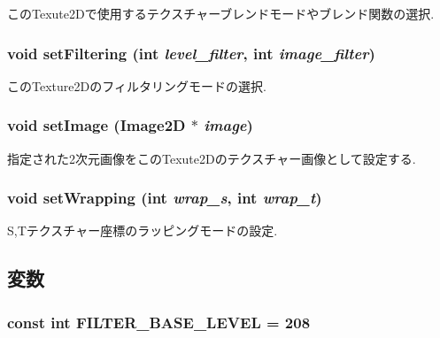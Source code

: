 このTexute2Dで使用するテクスチャーブレンドモードやブレンド関数の選択. \hypertarget{classm3g_1_1Texture2D_857574b5c0f3e0ca9239bafb4008cae1}{
\subsubsection[{setFiltering}]{\setlength{\rightskip}{0pt plus 5cm}void setFiltering (int {\em level\_\-filter}, \/  int {\em image\_\-filter})}}
\label{classm3g_1_1Texture2D_857574b5c0f3e0ca9239bafb4008cae1}


このTexture2Dのフィルタリングモードの選択. \hypertarget{classm3g_1_1Texture2D_705b89b41cd1b38f664ed912be44baaa}{
\subsubsection[{setImage}]{\setlength{\rightskip}{0pt plus 5cm}void setImage ({\bf Image2D} $\ast$ {\em image})}}
\label{classm3g_1_1Texture2D_705b89b41cd1b38f664ed912be44baaa}


指定された2次元画像をこのTexute2Dのテクスチャー画像として設定する. \hypertarget{classm3g_1_1Texture2D_e676f34bd2f5ee1508ad1cb771702d8f}{
\subsubsection[{setWrapping}]{\setlength{\rightskip}{0pt plus 5cm}void setWrapping (int {\em wrap\_\-s}, \/  int {\em wrap\_\-t})}}
\label{classm3g_1_1Texture2D_e676f34bd2f5ee1508ad1cb771702d8f}


S,Tテクスチャー座標のラッピングモードの設定. 

\subsection{変数}
\hypertarget{classm3g_1_1Texture2D_d1924d32385b5353ad11ecd8b1ec0ad5}{
\subsubsection[{FILTER\_\-BASE\_\-LEVEL}]{\setlength{\rightskip}{0pt plus 5cm}const int {\bf FILTER\_\-BASE\_\-LEVEL} = 208}}
\label{classm3g_1_1Texture2D_d1924d32385b5353ad11ecd8b1ec0ad5}


